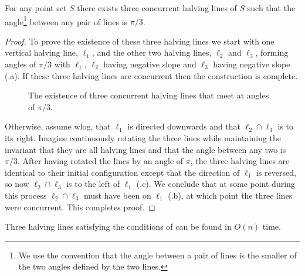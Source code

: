 \documentclass[lotsofwhite]{patmorin}
\begin{document}
\begin{lem}
For any point set $S$ there exists three concurrent halving lines 
of $S$ such that the angle\footnote{We use the convention that
the angle between a pair of lines is the smaller of the two angles
defined by the two lines.} between any pair of lines is $\pi/3$.
\end{lem}

\begin{proof}
To prove the existence of these three halving lines we start with one
vertical halving line, $\ell_1$, and the other two halving lines,
$\ell_2$ and $\ell_3$, forming angles of $\pi/3$ with $\ell_1$,
$\ell_2$ having negative slope and $\ell_3$ having negative slope
(.a).  If these three halving lines are concurrent
then the construction is complete. 

\begin{figure}
\caption{The existence of three concurrent halving lines that meet at angles of
$\pi/3$.}
\end{figure}
Otherwise, assume wlog, that $\ell_1$ is directed downwards and that
$\ell_2\cap \ell_3$ is to its right.  Imagine continuously rotating
the three lines while maintaining the invariant that they are all
halving lines and that the angle between any two is $\pi/3$.  After
having rotated the lines by an angle of $\pi$, the three halving lines
are identical to their initial configuration except that the direction
of $\ell_1$ is reversed, so now $\ell_2\cap\ell_3$ is to the left of
$\ell_1$ (.c).  We conclude that at some point
during this process $\ell_2\cap\ell_3$ must have been on $\ell_1$
(.b), at which point the three lines were
concurrent.  This completes proof.  
\end{proof}

\begin{lem}
Three halving lines satisfying the conditions of 
can be found in $O(n)$ time.
\end{lem}
\end{document}
